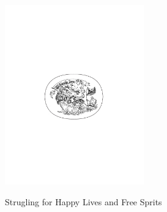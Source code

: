 
\begin{titlepage}

\begin{addmargin}[-1cm]{-3cm}
\begin{center}
\large

\hfill
\vfill

\begingroup
\color{Maroon}\spacedallcaps{\myTitle} \\ \bigskip %
\endgroup

\spacedlowsmallcaps{\myName} %

\vfill

\includegraphics[width=6cm]{gfx/TFZsuperellipse_bw} \\ \medskip %

Strugling for Happy Lives and Free Sprits\\ \medskip %


\vfill

\end{center}
\end{addmargin}

\end{titlepage}
